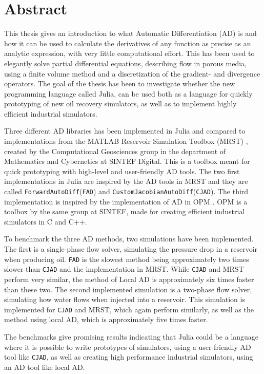 \chapter*{Abstract}
This thesis gives an introduction to what Automatic Differentiation (AD) is and how it can be used to calculate the derivatives of any function as precise as an analytic expression, with very little computational effort. This has been used to elegantly solve partial differential equations, describing flow in porous media, using a finite volume method and a discretization of the gradient- and divergence operators. The goal of the thesis has been to investigate whether the new programming language called Julia, can be used both as a language for quickly prototyping of new oil recovery simulators, as well as to implement highly efficient industrial simulators.

Three different AD libraries has been implemented in Julia and compared to implementations from the MATLAB Reservoir Simulation Toolbox (MRST) \emph{\citep{mrstHomepage}}, created by the Computational Geosciences  group  in  the  department  of  Mathematics  and  Cybernetics  at  SINTEF Digital. This is a toolbox meant for quick prototyping with high-level and user-friendly AD tools. The two first implementations in Julia are inspired by the AD tools in MRST and they are called \texttt{ForwardAutoDiff}(\texttt{FAD}) and \texttt{CustomJacobianAutoDiff}(\texttt{CJAD}). The third implementation is inspired by the implementation of AD in OPM \emph{\citep{opm}}. OPM is a toolbox by the same group at SINTEF, made for creating efficient industrial simulators in C and C++. 

To benchmark the three AD methods, two simulations have been implemented. The first is a single-phase flow solver, simulating the pressure drop in a reservoir when producing oil. \texttt{FAD} is the slowest method being approximately two times slower than \texttt{CJAD} and the implementation in MRST. While \texttt{CJAD} and MRST perform very similar, the method of Local AD is approximately six times faster than these two. The second implemented simulation is a two-phase flow solver, simulating how water flows when injected into a reservoir. This simulation is implemented for \texttt{CJAD} and MRST, which again perform similarly, as well as the method using local AD, which is approximately five times faster.

The benchmarks give promising results indicating that Julia could be a language where it is possible to write prototypes of simulators, using a user-friendly AD tool like \texttt{CJAD}, as well as creating high performance industrial simulators, using an AD tool like local AD.